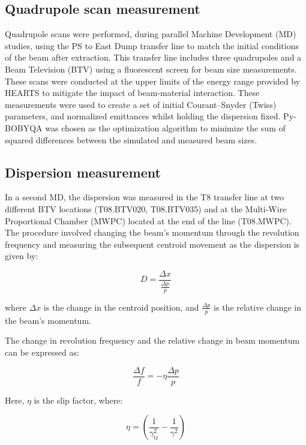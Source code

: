\documentclass[a4paper,
               biblatex,     %
               ]{jacow}
\begin{document}
\subsection{Quadrupole scan measurement}

 Quadrupole scans were performed, during parallel Machine Development (MD) studies, using the PS to East Dump transfer line to match the initial conditions of the beam after extraction. This transfer line includes three quadrupoles and a Beam Television (BTV) using a fluorescent screen for beam size measurements. These scans were conducted at the upper limits of the energy range provided by HEARTS to mitigate the impact of beam-material interaction. These measurements were used to create a set of initial Courant–Snyder (Twiss) parameters, and normalized emittances whilst holding the dispersion fixed. Py-BOBYQA \cite{cartis_escaping_2022, cartis_improving_2019} was chosen as the optimization algorithm to minimize the sum of squared differences between the simulated and measured beam sizes.


\subsection{Dispersion measurement}

In a second MD, the dispersion was measured in the T8 transfer line at two different BTV locations (T08.BTV020, T08.BTV035) and at the Multi-Wire Proportional Chamber (MWPC) located at the end of the line (T08.MWPC). The procedure involved changing the beam's momentum through the revolution frequency and measuring the subsequent centroid movement as the dispersion is given by:

\begin{equation}
D = \frac{\Delta x}{\frac{\Delta p}{p}}
\end{equation}

where $\Delta x$ is the change in the centroid position, and $\frac{\Delta p}{p}$ is the relative change in the beam's momentum.

The change in revolution frequency and the relative change in beam momentum can be expressed as:

\begin{equation}
\frac{\Delta f}{f} = -\eta \frac{\Delta p}{p}
\end{equation}

Here, $\eta$ is the slip factor, where:

\begin{equation}
\eta = \left(\frac{1}{\gamma_{\text{tr}}^{2}} - \frac{1}{\gamma^{2}}\right)
\end{equation}
\end{document}
